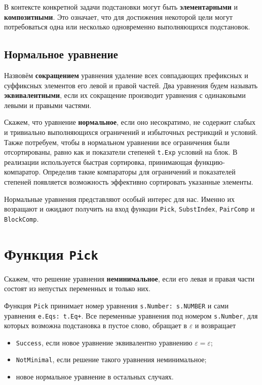\documentclass[12pt]{article}
\begin{document}
В контексте конкретной задачи подстановки могут быть \textbf{элементарными} и
\textbf{композитными}. Это означает, что для достижения некоторой цели могут
потребоваться одна или несколько одновременно выполняющихся подстановок.


\subsection{Нормальное уравнение}

Назвовём \textbf{сокращением} уравнения удаление всех совпадающих префиксных
и суффиксных элементов его левой и правой частей. Два уравнения будем называть
\textbf{эквивалентными}, если их сокращение производит уравнения с одинаковыми
левыми и правыми частями.

Скажем, что уравнение \textbf{нормальное}, если оно несократимо, не содержит
слабых и тривиально выполняющихся ограничений и избыточных рестрикций и условий.
Также потребуем, чтобы в нормальном уравнении все ограничения были
отсортированы, равно как и показатели степеней \texttt{t.Exp} условий на блок.
В реализации используется быстрая сортировка, принимающая функцию-компаратор.
Определив такие компараторы для ограничений и показателей степеней появляется
возможность эффективно сортировать указанные элементы.

Нормальные уравнения представляют особый интерес для нас. Именно их возращают и
ожидают получить на вход функции \texttt{Pick}, \texttt{SubstIndex},
\texttt{PairComp} и \texttt{BlockComp}.



\section{Функция \texttt{Pick}} \label{pick}

Скажем, что решение уравнения \textbf{неминимальное}, если его левая и правая
части состоят из непустых переменных и только них.

Функция \texttt{Pick} принимает номер уравнения \texttt{s.Number: s.NUMBER}
и сами уравнения \texttt{e.Eqs: t.Eq+}. Все переменные уравнения под номером
\texttt{s.Number}, для которых возможна подстановка в пустое слово, обращает в
$\varepsilon$ и возвращает
\begin{itemize}
  \item \texttt{Success}, если новое уравнение эквивалентно уравнению
  $\varepsilon = \varepsilon$;
  \item \texttt{NotMinimal}, если решение такого уравнения неминимальное;
  \item новое нормальное уравнение в остальных случаях.
\end{itemize}
\end{document}
